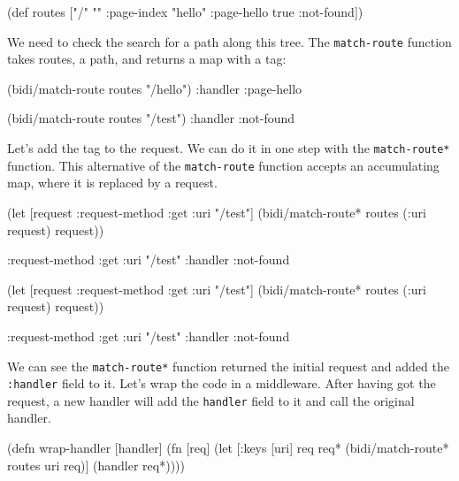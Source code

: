 \begin{clojure}
(def routes
  ["/" {""      :page-index
        "hello" :page-hello
        true    :not-found}])
\end{clojure}


We need to check the search for a path along this tree. The \verb|match-route| function takes routes, a path, and returns a map with a tag:

\begin{clojure}
(bidi/match-route routes "/hello")
{:handler :page-hello}

(bidi/match-route routes "/test")
{:handler :not-found}
\end{clojure}


Let's add the tag to the request. We can do it in one step with the \verb|match-route*| function. This alternative of the \verb|match-route| function accepts an accumulating map, where it is replaced by a request.

\ifx\DEVICETYPE\MOBILE

\begin{clojure}
(let [request {:request-method :get
               :uri "/test"}]
  (bidi/match-route*
    routes (:uri request) request))

{:request-method :get
 :uri "/test"
 :handler :not-found}
\end{clojure}

\else

\begin{clojure}
(let [request {:request-method :get
               :uri "/test"}]
  (bidi/match-route* routes (:uri request) request))

{:request-method :get
 :uri "/test"
 :handler :not-found}
\end{clojure}

\fi

We can see the \verb|match-route*| function returned the initial request and added the \verb|:handler| field to it. Let's wrap the code in a middleware. After having got the request, a new handler will add the \verb|handler| field to it and call the original handler.

\ifx\DEVICETYPE\MOBILE

\begin{clojure}
(defn wrap-handler [handler]
  (fn [req]
    (let [{:keys [uri]} req
           req* (bidi/match-route*
                  routes uri req)]
      (handler req*))))
\end{clojure}

